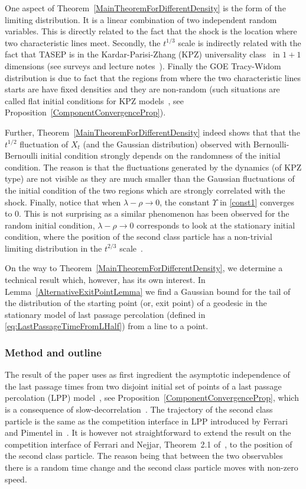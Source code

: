 \documentclass[12pt,a4paper]{article}
\numberwithin{equation}{section}
\begin{document}
One aspect of Theorem~\ref{MainTheoremForDifferentDensity} is the form of the limiting distribution. It is a linear combination of two independent random variables. This is directly related to the fact that  the shock is the location where two characteristic lines meet. Secondly, the $t^{1/3}$ scale is indirectly related with the fact that TASEP is in the Kardar-Parisi-Zhang (KPZ) universality class~\cite{KPZ86} in $1+1$ dimensions (see surveys and lecture notes~\cite{FS10,Cor11,QS15,BG12,Qua11,Fer10b}). Finally the GOE Tracy-Widom distribution is due to fact that the regions from where the two characteristic lines starts are have fixed densities and they are non-random (such situations are called flat initial conditions for KPZ models~\cite{PS00,Fer04}, see Proposition~\ref{ComponentConvergenceProp}).

Further, Theorem~\ref{MainTheoremForDifferentDensity} indeed shows that that the $t^{1/2}$ fluctuation of $X_t$ (and the Gaussian distribution) observed with Bernoulli-Bernoulli initial condition strongly depends on the randomness of the initial condition. The reason is that the fluctuations generated by the dynamics (of KPZ type) are not visible as they are much smaller than the Gaussian fluctuations of the initial condition of the two regions which are strongly correlated with the shock. Finally, notice that when $\lambda-\rho\to 0$, the constant  $\Upsilon$ in \eqref{const1} converges to $0$. This is not surprising as a similar phenomenon has been observed for the random initial condition, $\lambda-\rho\to 0$ corresponds to look at the stationary initial condition, where the position of the second class particle has a non-trivial limiting distribution in the $t^{2/3}$ scale~\cite{FS05a,PS01}.

On the way to  Theorem~\ref{MainTheoremForDifferentDensity}, we determine a technical result which, however, has its own interest. In Lemma~\ref{AlternativeExitPointLemma} we find a Gaussian bound for the tail of the distribution of the starting point (or, exit point) of a geodesic in the stationary model of last passage
percolation (defined in \eqref{eq:LastPassageTimeFromLHalf}) from a line to a point.

\subsubsection*{Method and outline}
The result of the paper uses as first ingredient the asymptotic independence of the last passage times from two disjoint initial set of points of a last passage percolation (LPP) model~\cite{FN13}, see Proposition~\ref{ComponentConvergenceProp}, which is a consequence of slow-decorrelation~\cite{Fer08,CFP10b}. The trajectory of the second class particle is the same as the competition interface in LPP introduced by Ferrari and Pimentel in~\cite{FP05B}. It is however not straightforward to extend the result on the competition interface of Ferrari and Nejjar, Theorem~2.1 of~\cite{FN16}, to the position of the second class particle. The reason being that between the two observables there is a random time change and the second class particle moves with non-zero speed.
\end{document}
